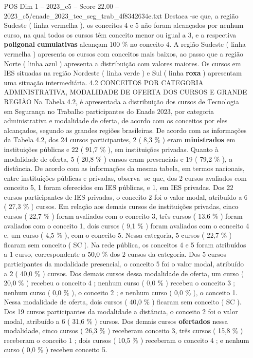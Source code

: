 \begin{textsample}{POS Dim 1 – 2023\_c5 – Score 22.00 – 2023\_c5/enade\_2023\_tec\_seg\_trab\_4f8342634e.txt}
Destaca -se que, a região Sudeste ( linha vermelha ), os conceitos 4 e 5 não foram alcançados por nenhum curso, na qual todos os cursos têm conceito menor ou igual a 3, e a respectiva \textbf{poligonal} \textbf{cumulativas} alcançam 100 \% no conceito 4.
A região Sudeste ( linha vermelha ) apresenta os cursos com conceitos mais baixos, ao passo que a região Norte ( linha azul ) apresenta a distribuição com valores maiores.
Os cursos em IES situadas na região Nordeste ( linha verde ) e Sul ( linha \textbf{roxa} ) apresentam uma situação intermediária. 4.2 CONCEITOS POR CATEGORIA ADMINISTRATIVA, MODALIDADE DE OFERTA DOS CURSOS E GRANDE REGIÃO Na Tabela 4.2, é apresentada a distribuição dos cursos de Tecnologia em Segurança no Trabalho participantes do Enade 2023, por categoria administrativa e modalidade de oferta, de acordo com os conceitos por eles alcançados, segundo as grandes regiões brasileiras.
De acordo com as informações da Tabela 4.2, dos 24 cursos participantes, 2 ( 8,3 \% ) eram \textbf{ministrados} em instituições públicas e 22 ( 91,7 \% ), em instituições privadas.
Quanto à modalidade de oferta, 5 ( 20,8 \% ) cursos eram presenciais e 19 ( 79,2 \% ), a distância.
De acordo com as informações da mesma tabela, em termos nacionais, entre instituições públicas e privadas, observa -se que, dos 2 cursos avaliados com conceito 5, 1 foram oferecidos em IES públicas, e 1, em IES privadas.
Dos 22 cursos participantes de IES privadas, o conceito 2 foi o valor modal, atribuído a 6 ( 27,3 \% ) cursos.
Em relação aos demais cursos de instituições privadas, cinco cursos ( 22,7 \% ) foram avaliados com o conceito 3, três cursos ( 13,6 \% ) foram avaliados com o conceito 1, dois cursos ( 9,1 \% ) foram avaliados com o conceito 4 e, um curso ( 4,5 \% ), com o conceito 5.
Nessa categoria, 5 cursos ( 22,7 \% ) ficaram sem conceito ( SC ).
Na rede pública, os conceitos 4 e 5 foram atribuídos a 1 curso, correspondente a 50,0 \% dos 2 cursos da categoria.
Dos 5 cursos participantes da modalidade presencial, o conceito 5 foi o valor modal, atribuído a 2 ( 40,0 \% ) cursos.
Dos demais cursos dessa modalidade de oferta, um curso ( 20,0 \% ) recebeu o conceito 4 ; nenhum curso ( 0,0 \% ) recebeu o conceito 3 ; nenhum curso ( 0,0 \% ), o conceito 2 ; e nenhum curso ( 0,0 \% ), o conceito 1.
Nessa modalidade de oferta, dois cursos ( 40,0 \% ) ficaram sem conceito ( SC ).
Dos 19 cursos participantes da modalidade a distância, o conceito 2 foi o valor modal, atribuído a 6 ( 31,6 \% ) cursos.
Dos demais cursos \textbf{ofertados} nessa modalidade, cinco cursos ( 26,3 \% ) receberam conceito 3, três cursos ( 15,8 \% ) receberam o conceito 1 ; dois cursos ( 10,5 \% ) receberam o conceito 4 ; e nenhum curso ( 0,0 \% ) recebeu conceito 5.

\end{textsample}
